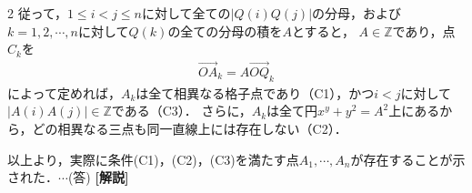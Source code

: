 \documentclass[../../main.tex]{subfiles}
\begin{document}
\begin{multicols}{2}
  従って，$1 \le i<j \le n$に対して全ての$|Q(i)Q(j)|$の分母，および$k=1,2,\cdots, n$に対して$Q(k)$の全ての分母の積を$A$とすると，
  $A\in\mathbb{Z}$であり，点$C_{k}$を
  \begin{align}
    \overrightarrow{OA}_{k} = A\overrightarrow{OQ}_{k}
  \end{align}
  によって定めれば，$A_{k}$は全て相異なる格子点であり（C1），かつ$i<j$に対して$|A(i)A(j)|\in\mathbb{Z}$である（C3）．
  さらに，$A_{k}$は全て円$x^y+y^2=A^2$上にあるから，どの相異なる三点も同一直線上には存在しない（C2）．

  以上より，実際に条件(C1)，(C2)，(C3)を満たす点$A_1,\cdots,A_n$が存在することが示された．$\cdots$(答)
  {\bf [解説]}

  \newpage
\end{multicols}
\end{document}
